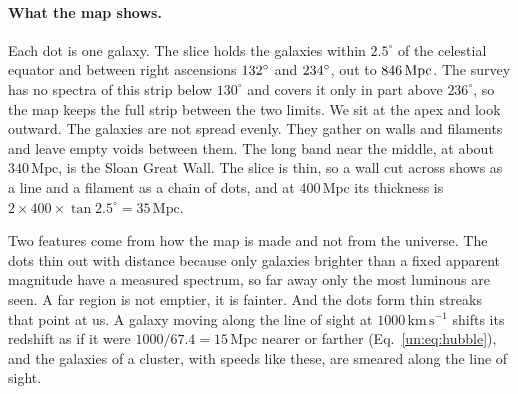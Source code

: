 \paragraph{What the map shows.} Each dot is one galaxy. The slice holds the galaxies within $2.5^\circ$ of the celestial equator and between right ascensions $132^\circ$ and $234^\circ$, out to $846\,\mathrm{Mpc}$. The survey has no spectra of this strip below $130^\circ$ and covers it only in part above $236^\circ$, so the map keeps the full strip between the two limits. We sit at the apex and look outward. The galaxies are not spread evenly. They gather on walls and filaments and leave empty voids between them. The long band near the middle, at about $340\,\mathrm{Mpc}$, is the Sloan Great Wall. The slice is thin, so a wall cut across shows as a line and a filament as a chain of dots, and at $400\,\mathrm{Mpc}$ its thickness is $2\times400\times\tan2.5^\circ=35\,\mathrm{Mpc}$.

Two features come from how the map is made and not from the universe. The dots thin out with distance because only galaxies brighter than a fixed apparent magnitude have a measured spectrum, so far away only the most luminous are seen. A far region is not emptier, it is fainter. And the dots form thin streaks that point at us. A galaxy moving along the line of sight at $1000\,\mathrm{km\,s^{-1}}$ shifts its redshift as if it were $1000/67.4=15\,\mathrm{Mpc}$ nearer or farther (Eq.~\eqref{un:eq:hubble}), and the galaxies of a cluster, with speeds like these, are smeared along the line of sight.

